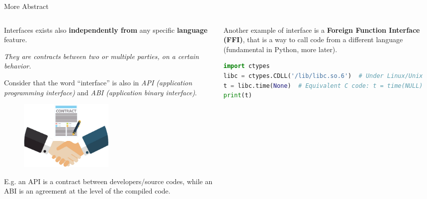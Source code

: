 \documentclass[9pt]{beamer}
\begin{document}
\begin{frame}[fragile]{More Abstract}
    \vspace*{30pt}
    \begin{columns}
        \begin{column}{0.5\textwidth}
            Interfaces exists also \textbf{independently from} any specific
            \textbf{language} feature.

            \begin{center}
                \itshape
                They are \alert{contracts} between two or multiple parties, on
                a certain behavior.
            \end{center}

            Consider that the word \enquote{interface} is also in \textit{API
            (application programming interface)} and \textit{ABI (application
            binary interface)}.\newline

            \begin{figure}
                \centering
                \includegraphics[width=0.5\textwidth]{contract}
            \end{figure}

            E.g. an API is a contract between developers/source codes, while an
            ABI is an agreement at the level of the compiled code.
        \end{column}
        \begin{column}{0.5\textwidth}
            Another example of interface is a \textbf{Foreign Function
            Interface (FFI)}, that is a way to call code from a different
            language (\alert{fundamental in Python}, more later).
            \vspace*{10pt}

            \begin{lstlisting}[language=Python,style=mystyle]
import ctypes
libc = ctypes.CDLL('/lib/libc.so.6')  # Under Linux/Unix
t = libc.time(None)  # Equivalent C code: t = time(NULL)
print(t)\end{lstlisting}
            \vspace*{20pt}


\end{column}
\end{columns}
\end{frame}
\end{document}
